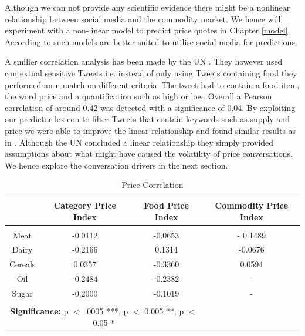  Although we can not provide any scientific evidence there might be a nonlinear relationship between social media and the commodity market. We hence will experiment with a non-linear model to predict price quotes in Chapter \ref{model}. According to \cite{de08} such models are better suited to utilise social media for predictions. 

A smilier correlation analysis has been made by the UN \cite{ungp2013}. They however used contextual sensitive Tweets i.e. instead of only using Tweets containing food they performed an n-match on different criteria. The tweet had to contain a food item, the word price and a quantification such as high or low. Overall a Pearson correlation of around 0.42 was detected with a significance of 0.04. By exploiting our predictor lexicon to filter Tweets that contain keywords such as supply and price we were able to improve the linear relationship and found similar results as in \cite{ungp2013}. Although the UN concluded a linear relationship they simply provided assumptions about what might have caused the volatility of price conversations. We hence explore the conversation drivers in the next section. 
 

 
\begin{table}[h]   
 \begin{tabular}{  c  | c  | c | c }
			
   & \textbf{Category Price Index}  & \textbf{Food Price Index} & \textbf{Commodity Price Index} \\
  \hline 
  &&& \\
  Meat & -0.0112   & -0.0653 & - 0.1489  \\
  
  Dairy & -0.2166   & 0.1314 & -0.0676\\

  Cereals & 0.0357  & -0.3360 & 0.0594 \\

  Oil & -0.2484  &  -0.2382 & -   \\

  Sugar & -0.2000 & -0.1019 &  - \\

\hline 

\multicolumn{3}{c}{\null}\\

\multicolumn{3}{c}{\textbf{Significance:} p $<$ .0005 ***, p $<$ 0.005 **, p $<$ 0.05 *}\\
\hline  

\end{tabular}
\caption{Price Correlation}
\label{tab:abc}


\end{table}


